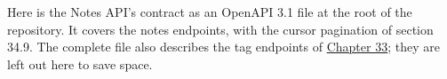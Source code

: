 Here is the Notes API's contract as an OpenAPI 3.1 file at the root of the repository. It covers the notes endpoints, with the cursor pagination of section 34.9. The complete file also describes the tag endpoints of \hyperref[ch:33-logic-execution]{Chapter 33}; they are left out here to save space.

\begin{codebox}

\begin{Shaded}
\begin{Highlighting}[]
\KeywordTok{:}\AttributeTok{ }
\KeywordTok{:}
\AttributeTok{  }\KeywordTok{:}
\AttributeTok{  }\KeywordTok{:}\AttributeTok{ }
\AttributeTok{  }\KeywordTok{:}


\end{Highlighting}
\end{Shaded}
\end{codebox}
